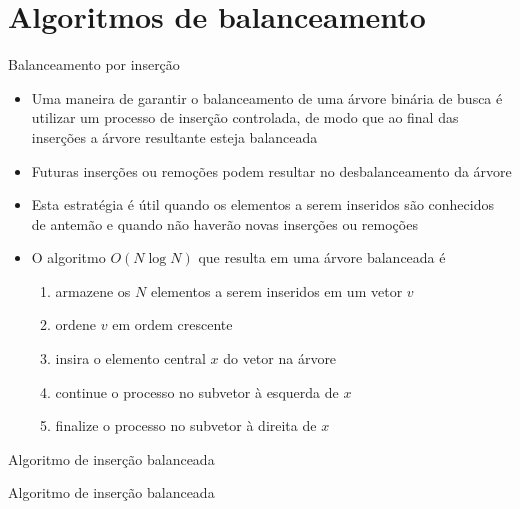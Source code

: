 \section{Algoritmos de balanceamento}

\begin{frame}[fragile]{Balanceamento por inserção}

    \begin{itemize}
        \item Uma maneira de garantir o balanceamento de uma árvore binária de busca
                é utilizar um processo de
            inserção controlada, de modo que ao final das inserções a árvore resultante esteja
            balanceada

        \item Futuras inserções ou remoções podem resultar no desbalanceamento da árvore

        \item Esta estratégia é útil quando os elementos a serem inseridos são conhecidos de
            antemão e quando não haverão novas inserções ou remoções

        \item O algoritmo $O(N\log N)$ que resulta em uma árvore balanceada é
        \begin{enumerate}
            \item armazene os $N$ elementos a serem inseridos em um vetor $v$
            \item ordene $v$ em ordem crescente
            \item insira o elemento central $x$ do vetor na árvore
            \item continue o processo no subvetor à esquerda de $x$
            \item finalize o processo no subvetor à direita de $x$
        \end{enumerate}
    \end{itemize}

\end{frame}

\begin{frame}[fragile]{Algoritmo de inserção balanceada}
\end{frame}

\begin{frame}[fragile]{Algoritmo de inserção balanceada}
\end{frame}
